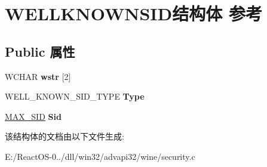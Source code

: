 \hypertarget{struct_w_e_l_l_k_n_o_w_n_s_i_d}{}\section{W\+E\+L\+L\+K\+N\+O\+W\+N\+S\+I\+D结构体 参考}
\label{struct_w_e_l_l_k_n_o_w_n_s_i_d}
\subsection*{Public 属性}
\begin{DoxyCompactItemize}
\item 
\mbox{\label{struct_w_e_l_l_k_n_o_w_n_s_i_d_ae14b8140e445726a8eb827ec5ad3bb8f}} 
W\+C\+H\+AR {\bfseries wstr} \mbox{[}2\mbox{]}
\item 
\mbox{\label{struct_w_e_l_l_k_n_o_w_n_s_i_d_aede175e32a07394377717c2cbc6d4c9e}} 
W\+E\+L\+L\+\_\+\+K\+N\+O\+W\+N\+\_\+\+S\+I\+D\+\_\+\+T\+Y\+PE {\bfseries Type}
\item 
\mbox{\label{struct_w_e_l_l_k_n_o_w_n_s_i_d_a4db54f114bd45e63e9408fd48652305c}} 
\hyperlink{struct___m_a_x___s_i_d}{M\+A\+X\+\_\+\+S\+ID} {\bfseries Sid}
\end{DoxyCompactItemize}


该结构体的文档由以下文件生成\+:\begin{DoxyCompactItemize}
\item 
E\+:/\+React\+O\+S-\/0../dll/win32/advapi32/wine/security.\+c\end{DoxyCompactItemize}
